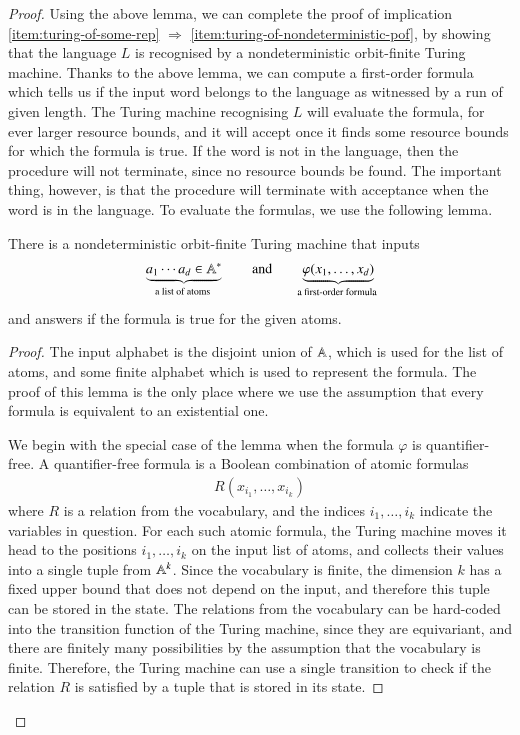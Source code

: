 \begin{proof}
	Using the above lemma, we can complete the proof of implication \ref{item:turing-of-some-rep} $\Rightarrow$ \ref{item:turing-of-nondeterministic-pof}, by showing that  the language $L$ is recognised by a nondeterministic orbit-finite Turing machine.
 Thanks to the above 
	lemma, we can compute a first-order formula which tells us if the input word belongs to the language as witnessed by a run of given length. The Turing machine recognising $L$ will evaluate the formula, for ever larger resource bounds, and it will accept once it finds some resource bounds for which the formula is true. If the word is not in the language, then the procedure will not terminate, since no resource bounds be found. The important thing, however, is that the procedure will terminate with acceptance when the word is in the language. To evaluate the formulas, we use the following lemma.
	

	\begin{lemma}\label{lem:compute-first-order-formula-using-turing}
		There is a nondeterministic orbit-finite Turing machine that inputs 
		\begin{align*}
		\myunderbrace{a_1 \cdots a_d \in \atoms^*}{a list of atoms}
		\qquad \text{and} \qquad 
		\myunderbrace{\varphi(x_1,\ldots,x_d)}{a first-order formula}
		\end{align*}
		and answers if the formula is true for the given atoms.
	\end{lemma}
	\begin{proof}
		The input alphabet is the disjoint union of $\mathbb A$, which is used for the list of atoms, and some finite alphabet which is used to represent the formula.  The proof of this lemma is the only place where we use the assumption that  every formula is equivalent to an existential one.
		
		We begin with the special case of the lemma when the formula $\varphi$ is quantifier-free. A quantifier-free formula is a Boolean combination of  atomic formulas 
		\begin{align*}
		R(x_{i_1},\ldots,x_{i_k})
		\end{align*}
		where $R$ is a relation from the vocabulary, and the indices $i_1,\ldots,i_k$ indicate the variables in question. For each such atomic formula, the Turing machine moves it head to the positions $i_1,\ldots,i_k$ on the input list of atoms, and collects their values into a single tuple from $\mathbb A^k$.  Since the vocabulary is finite, the dimension $k$ has a fixed upper bound that does not depend on the input, and therefore this tuple can be stored in the state. The relations from the vocabulary can  be hard-coded into the transition function of the Turing machine, since they are equivariant, and there are finitely many possibilities by the assumption that the vocabulary is finite. Therefore, the Turing machine can use a single transition to check if the relation $R$ is satisfied by a tuple that is stored in its state.
		

\end{proof}
\end{proof}
